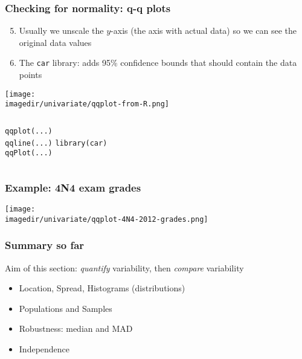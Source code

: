 \begin{frame}\frametitle{Checking for normality: q-q plots}
	\begin{enumerate}
		\setcounter{enumii}{4}
		\item	Usually we unscale the $y$-axis (the axis with actual data) so we can see the original data values
		\item	The \texttt{car} library: adds 95\% confidence bounds that should contain the data points
	\end{enumerate}
	\vspace{-8pt}
	\begin{center}
		\texttt{[image: \\imagedir/univariate/qqplot-from-R.png]}
		
		\begin{columns}[t]
				\texttt{qqplot(...)}\\
				\texttt{qqline(...)}
				\texttt{library(car)}\\
				\texttt{qqPlot(...)}
		\end{columns}
	\end{center}
	
\end{frame}

\begin{frame}\frametitle{Example: 4N4 exam grades}
	\begin{center}
		\texttt{[image: \\imagedir/univariate/qqplot-4N4-2012-grades.png]}
	\end{center}
\end{frame}

\begin{frame}\frametitle{Summary so far}

	Aim of this section: \emph{quantify} variability, then \emph{compare} variability
	\begin{itemize}
		\item	Location, Spread, Histograms (distributions)
		\item	Populations and Samples
		\item	Robustness: median and MAD
		\item	Independence
	\end{itemize}
\end{frame}

